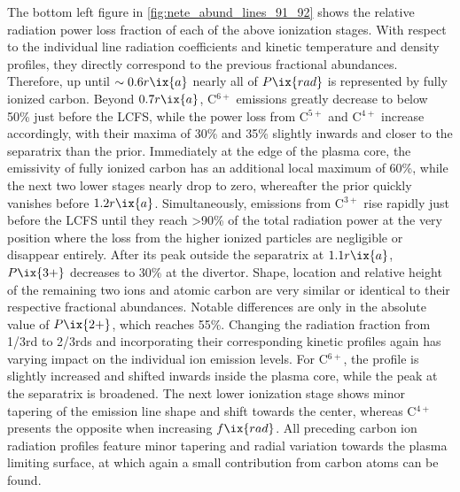         The bottom left figure in \cref{fig:nete_abund_lines_91_92} shows the relative radiation power loss fraction of each of the above ionization stages. With respect to the individual line radiation coefficients and kinetic temperature and density profiles, they directly correspond to the previous fractional abundances. Therefore, up until $\sim0.6r\ix{a}$ nearly all of $P\ix{rad}$ is represented by fully ionized carbon. Beyond $0.7r\ix{a}$, C$^{6+}$ emissions greatly decrease to below 50\% just before the LCFS, while the power loss from C$^{5+}$ and C$^{4+}$ increase accordingly, with their maxima of 30\% and 35\% slightly inwards and closer to the separatrix than the prior. Immediately at the edge of the plasma core, the emissivity of fully ionized carbon has an additional local maximum of 60\%, while the next two lower stages nearly drop to zero, whereafter the prior quickly vanishes before $1.2r\ix{a}$. Simultaneously, emissions from C$^{3+}$ rise rapidly just before the LCFS until they reach >90\% of the total radiation power at the very position where the loss from the higher ionized particles are negligible or disappear entirely. After its peak outside the separatrix at $1.1r\ix{a}$, $P\ix{3+}$ decreases to 30\% at the divertor. Shape, location and relative height of the remaining two ions and atomic carbon are very similar or identical to their respective fractional abundances. Notable differences are only in the absolute value of $P\ix{2+}$, which reaches 55\%. Changing the radiation fraction from 1/3rd to 2/3rds and incorporating their corresponding kinetic profiles again has varying impact on the individual ion emission levels. For C$^{6+}$, the profile is slightly increased and shifted inwards inside the plasma core, while the peak at the separatrix is broadened. The next lower ionization stage shows minor tapering of the emission line shape and shift towards the center, whereas C$^{4+}$ presents the opposite when increasing $f\ix{rad}$. All preceding carbon ion radiation profiles feature minor tapering and radial variation towards the plasma limiting surface, at which again a small contribution from carbon atoms can be found.\\%
